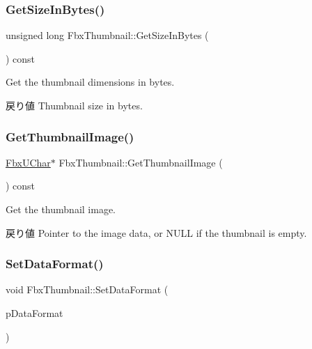 \subsubsection{\texorpdfstring{Get\+Size\+In\+Bytes()}{GetSizeInBytes()}}
{\footnotesize\ttfamily unsigned long Fbx\+Thumbnail\+::\+Get\+Size\+In\+Bytes (\begin{DoxyParamCaption}{ }\end{DoxyParamCaption}) const}

Get the thumbnail dimensions in bytes. \begin{DoxyReturn}{戻り値}
Thumbnail size in bytes. 
\end{DoxyReturn}
\mbox{\label{class_fbx_thumbnail_aade1213f9f4322aca855cd24de720c14}} 
\subsubsection{\texorpdfstring{Get\+Thumbnail\+Image()}{GetThumbnailImage()}}
{\footnotesize\ttfamily \hyperlink{fbxtypes_8h_a1be3cadf61e76f49142eb83e66ffe8bd}{Fbx\+U\+Char}$\ast$ Fbx\+Thumbnail\+::\+Get\+Thumbnail\+Image (\begin{DoxyParamCaption}{ }\end{DoxyParamCaption}) const}

Get the thumbnail image. \begin{DoxyReturn}{戻り値}
Pointer to the image data, or {\ttfamily N\+U\+LL} if the thumbnail is empty. 
\end{DoxyReturn}
\mbox{\label{class_fbx_thumbnail_aa0da5afd782261ee47d9322bacf9a619}} 
\subsubsection{\texorpdfstring{Set\+Data\+Format()}{SetDataFormat()}}
{\footnotesize\ttfamily void Fbx\+Thumbnail\+::\+Set\+Data\+Format (\begin{DoxyParamCaption}\item[{\hyperlink{class_fbx_thumbnail_a60bdaa7e6f78e26f4a8810c552958a0a}{E\+Data\+Format}}]{p\+Data\+Format }\end{DoxyParamCaption})}

